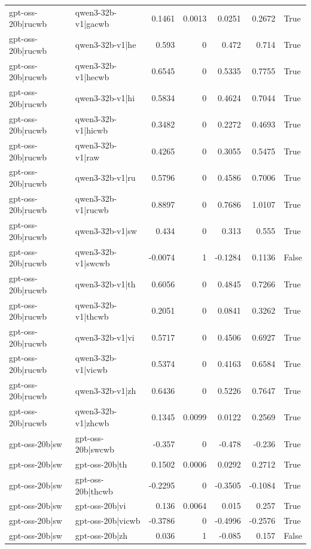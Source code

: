 \begin{table}
\begin{tabular}{l l r r r r l}
gpt-oss-20b|rucwb & qwen3-32b-v1|gacwb & 0.1461 & 0.0013 & 0.0251 & 0.2672 & True \\
gpt-oss-20b|rucwb & qwen3-32b-v1|he & 0.593 & 0 & 0.472 & 0.714 & True \\
gpt-oss-20b|rucwb & qwen3-32b-v1|hecwb & 0.6545 & 0 & 0.5335 & 0.7755 & True \\
gpt-oss-20b|rucwb & qwen3-32b-v1|hi & 0.5834 & 0 & 0.4624 & 0.7044 & True \\
gpt-oss-20b|rucwb & qwen3-32b-v1|hicwb & 0.3482 & 0 & 0.2272 & 0.4693 & True \\
gpt-oss-20b|rucwb & qwen3-32b-v1|raw & 0.4265 & 0 & 0.3055 & 0.5475 & True \\
gpt-oss-20b|rucwb & qwen3-32b-v1|ru & 0.5796 & 0 & 0.4586 & 0.7006 & True \\
gpt-oss-20b|rucwb & qwen3-32b-v1|rucwb & 0.8897 & 0 & 0.7686 & 1.0107 & True \\
gpt-oss-20b|rucwb & qwen3-32b-v1|sw & 0.434 & 0 & 0.313 & 0.555 & True \\
gpt-oss-20b|rucwb & qwen3-32b-v1|swcwb & -0.0074 & 1 & -0.1284 & 0.1136 & False \\
gpt-oss-20b|rucwb & qwen3-32b-v1|th & 0.6056 & 0 & 0.4845 & 0.7266 & True \\
gpt-oss-20b|rucwb & qwen3-32b-v1|thcwb & 0.2051 & 0 & 0.0841 & 0.3262 & True \\
gpt-oss-20b|rucwb & qwen3-32b-v1|vi & 0.5717 & 0 & 0.4506 & 0.6927 & True \\
gpt-oss-20b|rucwb & qwen3-32b-v1|vicwb & 0.5374 & 0 & 0.4163 & 0.6584 & True \\
gpt-oss-20b|rucwb & qwen3-32b-v1|zh & 0.6436 & 0 & 0.5226 & 0.7647 & True \\
gpt-oss-20b|rucwb & qwen3-32b-v1|zhcwb & 0.1345 & 0.0099 & 0.0122 & 0.2569 & True \\
gpt-oss-20b|sw & gpt-oss-20b|swcwb & -0.357 & 0 & -0.478 & -0.236 & True \\
gpt-oss-20b|sw & gpt-oss-20b|th & 0.1502 & 0.0006 & 0.0292 & 0.2712 & True \\
gpt-oss-20b|sw & gpt-oss-20b|thcwb & -0.2295 & 0 & -0.3505 & -0.1084 & True \\
gpt-oss-20b|sw & gpt-oss-20b|vi & 0.136 & 0.0064 & 0.015 & 0.257 & True \\
gpt-oss-20b|sw & gpt-oss-20b|vicwb & -0.3786 & 0 & -0.4996 & -0.2576 & True \\
gpt-oss-20b|sw & gpt-oss-20b|zh & 0.036 & 1 & -0.085 & 0.157 & False \\

\end{tabular}
\end{table}
